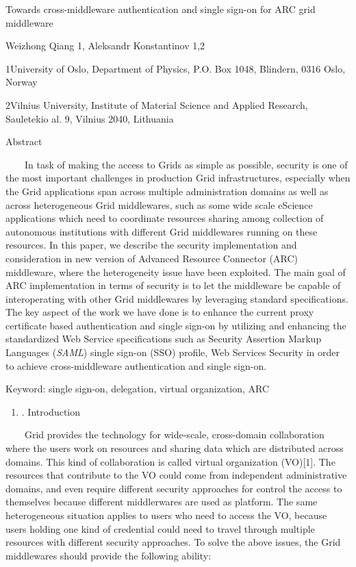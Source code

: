\documentclass{article}
\title{}
\newcommand\liststyleLi{%
\renewcommand\theenumi{\arabic{enumi}}
\renewcommand\theenumii{\arabic{enumii}}
\renewcommand\theenumiii{\arabic{enumiii}}
\renewcommand\theenumiv{\arabic{enumiv}}
\renewcommand\labelenumi{\theenumi.}
\renewcommand\labelenumii{\theenumii.}
\renewcommand\labelenumiii{\theenumiii.}
\renewcommand\labelenumiv{\theenumiv.}
}
\begin{document}
{\centering
Towards cross-middleware authentication and single sign-on for ARC grid
middleware
\par}

{\centering
Weizhong Qiang 1, Aleksandr Konstantinov 1,2 
\par}

{\centering
1University of Oslo, Department of Physics, P.O. Box 1048, Blindern,
0316 Oslo, Norway
\par}

{\centering
2Vilnius University, Institute of Material Science and Applied Research,
Sauletekio al. 9, Vilnius 2040, Lithuania 
\par}


\bigskip

{\centering
Abstract
\par}

\ \ \ \ In task of making the access to Grids as simple as possible,
security is one of the most important challenges in production Grid
infrastructures, especially when the Grid applications span across
multiple administration domains as well as across heterogeneous Grid
middlewares, such as some wide scale eScience applications which need
to coordinate resources sharing among collection of autonomous
institutions with different Grid middlewares running on these
resources. In this paper, we describe the security implementation and
consideration in new version of Advanced Resource Connector (ARC)
middleware, where the heterogeneity issue have been exploited. The main
goal of ARC implementation in terms of security is to let the
middleware be capable of interoperating with other Grid middlewares by
leveraging standard specifications. The key aspect of the work we have
done is to enhance the current proxy certificate based authentication
and single sign-on by utilizing and enhancing the standardized Web
Service specifications such as Security Assertion Markup Languages
(\textit{SAML}) single sign-on (SSO) profile, Web Services Security in
order to achieve cross-middleware authentication and single sign-on.

Keyword: single sign-on, delegation, virtual organization, ARC

\liststyleLi
\begin{enumerate}
\item[] {. Introduction
\par}
\end{enumerate}
\ \ \ \ Grid provides the technology for wide-scale, cross-domain
collaboration where the users work on resources and sharing data which
are distributed across domains. This kind of collaboration is called
virtual organization (VO)[1]. The resources that contribute to the VO
could come from independent administrative domains, and even require
different security approaches for control the access to themselves
because different middlerwares are used as platform. The same
heterogeneous situation applies to users who need to access the VO,
because users holding one kind of credential could need to travel
through multiple resources with different security approaches. To solve
the above issues, the Grid middlewares should provide the following
ability: 
\end{document}
